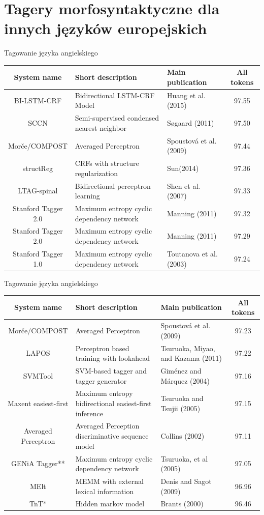 \documentclass{beamer}
\begin{document}
\section{Tagery morfosyntaktyczne dla innych języków europejskich}
\frame{\sectionpage}

\begin{frame}{Tagowanie języka angielskiego}
  \footnotesize
  \begin{tabular}{cp{3.5cm}p{2.5cm}c}
    System name & Short description & Main publication & All tokens \\ \hline
    BI-LSTM-CRF & Bidirectional LSTM-CRF Model & Huang et al. (2015) & 97.55 \\ \hline
    SCCN & Semi-supervised condensed nearest neighbor & Søgaard (2011) & 97.50 \\ \hline
    Morče/COMPOST & Averaged Perceptron & Spoustová et al. (2009) & 97.44 \\ \hline
    structReg & CRFs with structure regularization & Sun(2014) & 97.36 \\ \hline
    LTAG-spinal & Bidirectional perceptron learning & Shen et al. (2007) & 97.33 \\ \hline
    Stanford Tagger 2.0 & Maximum entropy cyclic dependency network & Manning (2011) & 97.32 \\ \hline
    Stanford Tagger 2.0 & Maximum entropy cyclic dependency network & Manning (2011) & 97.29 \\ \hline
    Stanford Tagger 1.0 & Maximum entropy cyclic dependency network & Toutanova et al. (2003) & 97.24 \\ \hline
  \end{tabular}
\end{frame}

\begin{frame}{Tagowanie języka angielskiego}
  \footnotesize
  \begin{tabular}{cp{3.5cm}p{2.5cm}c}
    System name & Short description & Main publication & All tokens \\ \hline
    Morče/COMPOST & Averaged Perceptron & Spoustová et al. (2009) & 97.23 \\ \hline
    LAPOS & Perceptron based training with lookahead & Tsuruoka, Miyao, and Kazama (2011) & 97.22 \\ \hline
    SVMTool & SVM-based tagger and tagger generator & Giménez and Márquez (2004) & 97.16 \\ \hline
    Maxent easiest-first & Maximum entropy bidirectional easiest-first inference & Tsuruoka and Tsujii (2005) & 97.15 \\ \hline
    Averaged Perceptron & Averaged Perception discriminative sequence model & Collins (2002) & 97.11 \\ \hline
    GENiA Tagger** & Maximum entropy cyclic dependency network & Tsuruoka, et al (2005) & 97.05 \\ \hline
    MElt & MEMM with external lexical information & Denis and Sagot (2009) & 96.96 \\ \hline
    TnT* & Hidden markov model & Brants (2000) & 96.46 \\ \hline
\end{tabular}
\end{frame}
\end{document}
